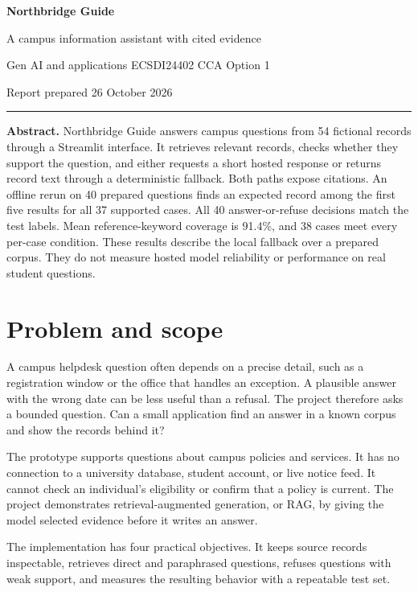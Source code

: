 \documentclass[11pt,a4paper]{article}
\begin{document}
{\LARGE\bfseries\color{ink} Northbridge Guide\par}
{\large A campus information assistant with cited evidence\par}
\vspace{4pt}
{\small Gen AI and applications \textbar{} ECSDI24402 \textbar{} CCA Option 1\par}
{\small Report prepared 26 October 2026\par}
\vspace{4pt}\hrule\vspace{6pt}

\textbf{Abstract.}
Northbridge Guide answers campus questions from 54 fictional records through a Streamlit interface. It retrieves relevant records, checks whether they support the question, and either requests a short hosted response or returns record text through a deterministic fallback. Both paths expose citations. An offline rerun on 40 prepared questions finds an expected record among the first five results for all 37 supported cases. All 40 answer-or-refuse decisions match the test labels. Mean reference-keyword coverage is 91.4\%, and 38 cases meet every per-case condition. These results describe the local fallback over a prepared corpus. They do not measure hosted model reliability or performance on real student questions.

\section{Problem and scope}
A campus helpdesk question often depends on a precise detail, such as a registration window or the office that handles an exception. A plausible answer with the wrong date can be less useful than a refusal. The project therefore asks a bounded question. Can a small application find an answer in a known corpus and show the records behind it?

The prototype supports questions about campus policies and services. It has no connection to a university database, student account, or live notice feed. It cannot check an individual's eligibility or confirm that a policy is current. The project demonstrates retrieval-augmented generation, or RAG, by giving the model selected evidence before it writes an answer.

The implementation has four practical objectives. It keeps source records inspectable, retrieves direct and paraphrased questions, refuses questions with weak support, and measures the resulting behavior with a repeatable test set.
\end{document}
